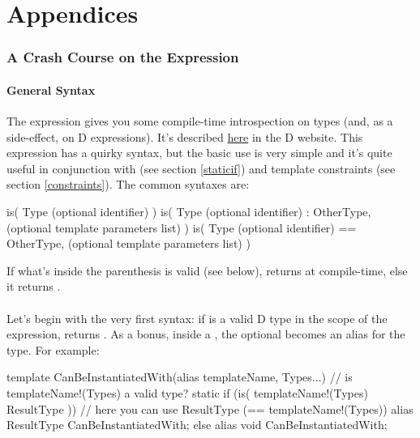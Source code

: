 \newpage
\part*{Appendices}
\appendix
\section{
\texorpdfstring{A Crash Course on the  Expression}
               {A Crash Course on the is(...) expression}}
\label{isexpression}

\subsection{General Syntax} \label{issyntax}

The  expression gives you some compile-time introspection on types (and, as a side-effect, on D expressions). It's described \href{http://www.dlang.org/expression.html#IsExpression}{here} in the D website. This expression has a quirky syntax, but the basic use is very simple and it's quite useful in conjunction with  (see section \ref{staticif}) and template constraints (see section \ref{constraints}). The common syntaxes are:

\begin{dcode}
is( Type (optional identifier) )
is( Type (optional identifier) :  OtherType, 
         (optional template parameters list) )
is( Type (optional identifier) == OtherType, 
         (optional template parameters list) )
\end{dcode}

If what's inside the parenthesis is valid (see below), \DD{()} returns  at compile-time, else it returns .

\subsection{\texorpdfstring{}
                           {is(Type)}}
\label{istype}

Let's begin with the very first syntax: if  is a valid D type in the scope of the  expression, \DD{()} returns . As a bonus, inside a , the optional  becomes an alias for the type. For example:

\begin{dcode}
template CanBeInstantiatedWith(alias templateName, Types...)
{
    // is templateName!(Types) a valid type?
    static if (is( templateName!(Types) ResultType ))
    // here you can use ResultType (== templateName!(Types))
        alias ResultType CanBeInstantiatedWith;
    else
        alias void       CanBeInstantiatedWith;
}
\end{dcode}

